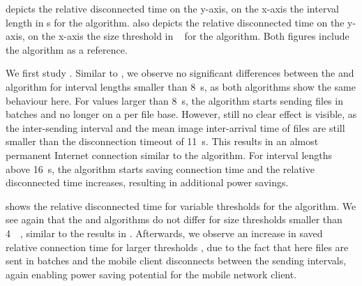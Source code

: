  depicts the relative disconnected time \relativeDisconnectedTime on the y-axis, on the x-axis the interval length \thresholdInterval in \si{\second} for the \algointerval algorithm.
 also depicts the relative disconnected time \relativeDisconnectedTime on the y-axis, on the x-axis the size threshold \thresholdSize in \si{\mega\byte} for the \algosize algorithm.
Both figures include the \algoimmediate algorithm as a reference.

We first study .
Similar to , we observe no significant differences between the \algointerval and \algoimmediate algorithm for interval lengths \thresholdInterval smaller than \SI{8}{\second}, as both algorithms show the same behaviour here.
For values larger than \SI{8}{\second}, the \algointerval algorithm starts sending files in batches and no longer on a per file base.
However, still no clear effect is visible, as the inter-sending interval and the mean image inter-arrival time of files are still smaller than the disconnection timeout of \SI{11}{\second}.
This results in an almost permanent Internet connection similar to the \algoimmediate algorithm.
For interval lengths \thresholdInterval above \SI{16}{\second}, the \algointerval algorithm starts saving connection time and the relative disconnected time \relativeDisconnectedTime increases, resulting in additional power savings.

 shows the relative disconnected time \relativeDisconnectedTime for variable thresholds for the \algosize algorithm.
We see again that the \algosize and \algoimmediate algorithms do not differ for size thresholds \thresholdSize smaller than \SI{4}{\mega\byte}, similar to the results in .
Afterwards, we observe an increase in saved relative connection time \relativeDisconnectedTime for larger thresholds \thresholdSize, due to the fact that here files are sent in batches and the mobile client disconnects between the sending intervals, again enabling power saving potential for the mobile network client.

